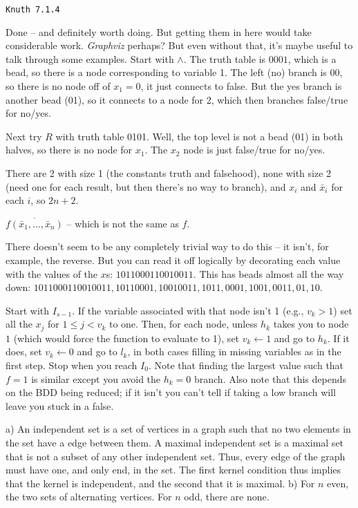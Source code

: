 \topglue 0.5in
\centerline{\tt Knuth 7.1.4}
\vskip 0.3in

 Done -- and definitely worth doing.  But getting
them in here would take considerable work.  {\it Graphviz} perhaps?  But
even without that, it's maybe useful to talk through some examples.
Start with $\land$.  The truth table is $0001$, which is a bead, so there
is a node corresponding to variable 1.  The left (no) branch is $00$, so
there is no node off of $x_1 = 0$, it just connects to false.  But the yes
branch is another bead (01), so it connects to a node for 2, which then branches
false/true for no/yes.

Next try $R$ with truth table 0101.  Well, the top level is not a bead (01) in both
halves, so there is no node for $x_1$.  The $x_2$ node is just false/true for
no/yes.

\vskip 0.08in  There are 2 with size 1 (the constants truth and 
falsehood), none with size 2 (need one for each result, but then there's no way to branch),
and $x_i$ and $\bar x_i$ for each $i$, so $2n + 2$.

\vskip 0.08in  $\overline{f\left(\bar x_1, \ldots, \bar x_n\right)}$ --
which is not the same as $f$.

\vskip 0.08in  There doesn't seem to be any completely
trivial way to do this -- it isn't, for example, the reverse.  But you can read
it off logically by decorating each value with the values of the $x$s:
$1 0 1 1 0 0 0 1 1 0 0 1 0 0 1 1$.  This has beads almost all the way down:
$1011000110010011, 10110001, 10010011, 1011, 0001, 1001, 0011, 01, 10$. 

\vskip 0.08in  Start with $I_{s-1}$.  If the 
variable associated with that node isn't 1 (e.g., $v_k > 1$) set
all the $x_j$ for $1 \le j < v_k$ to one.  Then, for each node, unless
$h_k$ takes you to node $1$ (which would force the function to evaluate
to 1), set $v_k \gets 1$ and go to $h_k$.
If it does, set $v_k \gets 0$ and go to $l_k$, in both cases filling
in missing variables as in the first step.  Stop when you reach
$I_0$.  Note that finding the largest value such that $f=1$ is similar
except you avoid the $h_k = 0$ branch.  Also note that this depends on
the BDD being reduced; if it isn't you can't tell if taking a low branch will
leave you stuck in a false.

\vskip 0.08in  a) An independent set is a set
of vertices in a graph such that no two elements in the set have a edge
between them.  A maximal independent set is a maximal set that is
not a subset of any other independent set.  Thus, every edge of the graph must have
one, and only end, in the set. The first kernel condition thus implies that the kernel 
is independent, and the second that it is maximal.\hfil\break
b) For $n$ even, the two sets of alternating vertices.  For $n$ odd, there are none.


